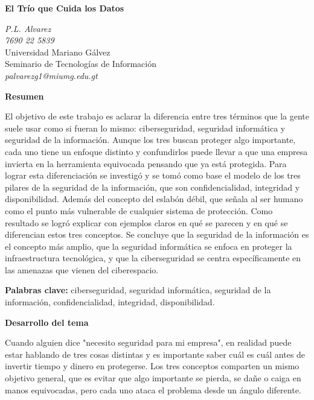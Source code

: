 \documentclass[12pt,letterpaper]{article}
\begin{document}
\begin{center}
\textbf{\Large El Trío que Cuida los Datos}
\end{center}

\begin{center}
\textit{P.L. Alvarez} \\
\textit{7690 22 5839} \\
Universidad Mariano Gálvez \\
Seminario de Tecnologías de Información \\
\textit{palvarezg1@miumg.edu.gt}
\end{center}

\vspace{0.5cm}

\textbf{Resumen}

El objetivo de este trabajo es aclarar la diferencia entre tres términos que la gente suele usar como si fueran lo mismo: ciberseguridad, seguridad informática y seguridad de la información. Aunque los tres buscan proteger algo importante, cada uno tiene un enfoque distinto y confundirlos puede llevar a que una empresa invierta en la herramienta equivocada pensando que ya está protegida. Para lograr esta diferenciación se investigó y se tomó como base el modelo de los tres pilares de la seguridad de la información, que son confidencialidad, integridad y disponibilidad. Además del concepto del eslabón débil, que señala al ser humano como el punto más vulnerable de cualquier sistema de protección. Como resultado se logró explicar con ejemplos claros en qué se parecen y en qué se diferencian estos tres conceptos. Se concluye que la seguridad de la información es el concepto más amplio, que la seguridad informática se enfoca en proteger la infraestructura tecnológica, y que la ciberseguridad se centra específicamente en las amenazas que vienen del ciberespacio.

\textbf{Palabras clave:} ciberseguridad, seguridad informática, seguridad de la información, confidencialidad, integridad, disponibilidad.

\textbf{Desarrollo del tema}

Cuando alguien dice "necesito seguridad para mi empresa", en realidad puede estar hablando de tres cosas distintas y es importante saber cuál es cuál antes de invertir tiempo y dinero en protegerse. Los tres conceptos comparten un mismo objetivo general, que es evitar que algo importante se pierda, se dañe o caiga en manos equivocadas, pero cada uno ataca el problema desde un ángulo diferente.
\end{document}
